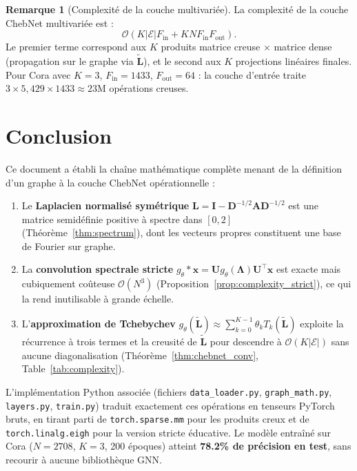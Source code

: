 \documentclass[12pt, a4paper]{article}
\theoremstyle{definition}
\newtheorem{remark}[theorem]{Remarque}
\newcommand{\calE}{\mathcal{E}}
\newcommand{\mat}[1]{\mathbf{#1}}
\newcommand{\A}{\mat{A}}
\newcommand{\D}{\mat{D}}
\newcommand{\I}{\mat{I}}
\newcommand{\L}{\mat{L}}
\newcommand{\Lt}{\tilde{\mat{L}}}
\newcommand{\Lam}{\mat{\Lambda}}
\newcommand{\U}{\mat{U}}
\newcommand{\x}{\mathbf{x}}
\begin{document}
\begin{remark}[Complexité de la couche multivariée]
La complexité de la couche ChebNet multivariée est :
\[
  \mathcal{O}(K |\calE| F_{\text{in}} + K N F_{\text{in}} F_{\text{out}}).
\]
Le premier terme correspond aux $K$ produits matrice creuse $\times$ matrice dense
(propagation sur le graphe via $\Lt$), et le second aux $K$ projections linéaires finales.
Pour Cora avec $K=3$, $F_{\text{in}} = 1433$, $F_{\text{out}} = 64$ :
la couche d'entrée traite $3 \times 5{,}429 \times 1433 \approx 23\text{M}$ opérations creuses.
\end{remark}

\section*{Conclusion}

Ce document a établi la chaîne mathématique complète menant de la définition d'un graphe
à la couche ChebNet opérationnelle :

\begin{enumerate}
  \item Le \textbf{Laplacien normalisé symétrique} $\L = \I - \D^{-1/2}\A\D^{-1/2}$
    est une matrice semidéfinie positive à spectre dans $[0, 2]$
    (Théorème~\ref{thm:spectrum}), dont les vecteurs propres constituent
    une base de Fourier sur graphe.
  \item La \textbf{convolution spectrale stricte} $g_\theta * \x = \U g_\theta(\Lam)\U^\top \x$
    est exacte mais cubiquement coûteuse $\mathcal{O}(N^3)$
    (Proposition~\ref{prop:complexity_strict}), ce qui la rend inutilisable
    à grande échelle.
  \item L'\textbf{approximation de Tchebychev}
    $g_\theta(\Lt) \approx \sum_{k=0}^{K-1} \theta_k T_k(\Lt)$
    exploite la récurrence à trois termes et la creusité de $\Lt$
    pour descendre à $\mathcal{O}(K|\calE|)$ sans aucune diagonalisation
    (Théorème~\ref{thm:chebnet_conv}, Table~\ref{tab:complexity}).
\end{enumerate}

L'implémentation Python associée (fichiers \texttt{data\_loader.py}, \texttt{graph\_math.py},
\texttt{layers.py}, \texttt{train.py}) traduit exactement ces opérations en tenseurs
PyTorch bruts, en tirant parti de \texttt{torch.sparse.mm} pour les produits creux
et de \texttt{torch.linalg.eigh} pour la version stricte éducative.
Le modèle entraîné sur Cora ($N = 2708$, $K = 3$, 200 époques) atteint
\textbf{78.2\% de précision en test}, sans recourir à aucune bibliothèque GNN.
\end{document}

